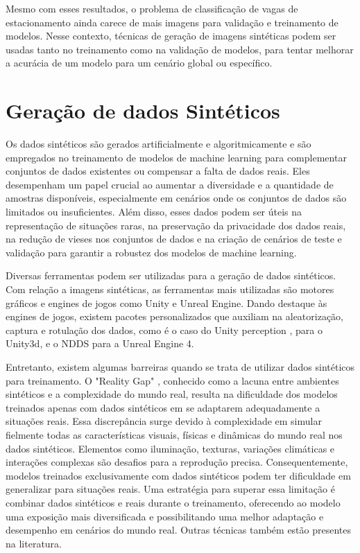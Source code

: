 Mesmo com esses resultados, o problema de classificação de vagas de estacionamento ainda carece de mais imagens para validação e treinamento de modelos. Nesse contexto, técnicas de geração de imagens sintéticas podem ser usadas tanto no treinamento como na validação de modelos, para tentar melhorar a acurácia de um modelo para um cenário global ou específico.

\section{Geração de dados Sintéticos}

Os dados sintéticos são gerados artificialmente e algoritmicamente e são empregados no treinamento de modelos de machine learning para complementar conjuntos de dados existentes ou compensar a falta de dados reais. Eles desempenham um papel crucial ao aumentar a diversidade e a quantidade de amostras disponíveis, especialmente em cenários onde os conjuntos de dados são limitados ou insuficientes. Além disso, esses dados podem ser úteis na representação de situações raras, na preservação da privacidade dos dados reais, na redução de vieses nos conjuntos de dados e na criação de cenários de teste e validação para garantir a robustez dos modelos de machine learning.

Diversas ferramentas podem ser utilizadas para a geração de dados sintéticos. Com relação a imagens sintéticas, as ferramentas mais utilizadas são motores gráficos e engines de jogos como Unity e Unreal Engine. Dando destaque às engines de jogos, existem pacotes personalizados que auxiliam na aleatorização, captura e rotulação dos dados, como é o caso do Unity perception \citep{unity-perception}, para o Unity3d, e o NDDS \citep{NDDS} para a Unreal Engine 4.

Entretanto, existem algumas barreiras quando se trata de utilizar dados sintéticos para treinamento. O "Reality Gap" \citep{domain-random}, conhecido como a lacuna entre ambientes sintéticos e a complexidade do mundo real, resulta na dificuldade dos modelos treinados apenas com dados sintéticos em se adaptarem adequadamente a situações reais. Essa discrepância surge devido à complexidade em simular fielmente todas as características visuais, físicas e dinâmicas do mundo real nos dados sintéticos. Elementos como iluminação, texturas, variações climáticas e interações complexas são desafios para a reprodução precisa. Consequentemente, modelos treinados exclusivamente com dados sintéticos podem ter dificuldade em generalizar para situações reais. Uma estratégia para superar essa limitação é combinar dados sintéticos e reais durante o treinamento, oferecendo ao modelo uma exposição mais diversificada e possibilitando uma melhor adaptação e desempenho em cenários do mundo real. Outras técnicas também estão presentes na literatura.

